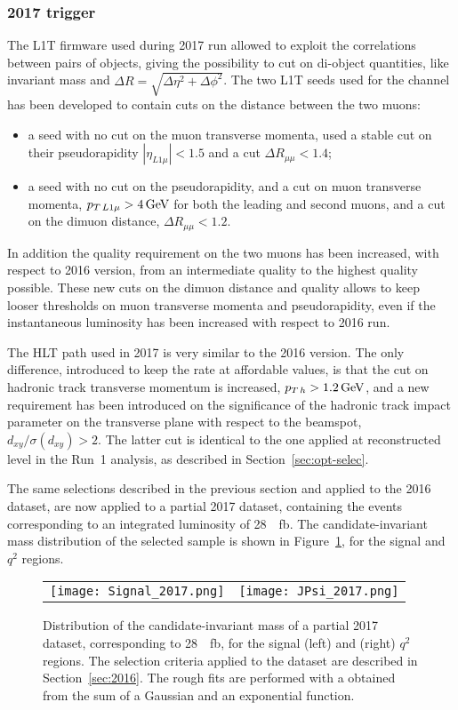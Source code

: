 \subsubsection{2017 trigger}
\label{sec:2017}

The L1T firmware used during 2017 run allowed to exploit the correlations between pairs of objects, giving the possibility to cut on di-object quantities, like invariant mass and $\Delta R=\sqrt{\Delta\eta^2 + \Delta\phi^2}$.
The two L1T seeds used for the \BtoKstmumu channel has been developed to contain cuts on the distance between the two muons:
\begin{itemize}
\item a seed with no cut on the muon transverse momenta, used a stable cut on their pseudorapidity $|\eta_{L1\mu}|<1.5$ and a cut $\Delta R_{\mu\mu}<1.4$;
\item a seed with no cut on the pseudorapidity, and a cut on muon transverse momenta, $p_{T\,L1\mu}>4\,\textrm{GeV}$ for both the leading and second muons, and a cut on the dimuon distance, $\Delta R_{\mu\mu}<1.2$.
\end{itemize}
In addition the quality requirement on the two muons has been increased, with respect to 2016 version, from an intermediate quality to the highest quality possible.
These new cuts on the dimuon distance and quality allows to keep looser thresholds on muon transverse momenta and pseudorapidity, even if the instantaneous luminosity has been increased with respect to 2016 run.

The HLT path used in 2017 is very similar to the 2016 version.
The only difference, introduced to keep the rate at affordable values, is that the cut on hadronic track transverse momentum is increased, $p_{T\,h}>1.2\,\textrm{GeV}$, and a new requirement has been introduced on the significance of the hadronic track impact parameter on the transverse plane with respect to the beamspot, $d_{xy}/\sigma(d_{xy}) > 2$.
The latter cut is identical to the one applied at reconstructed level in the Run~1 analysis, as described in Section~\ref{sec:opt-selec}.

The same selections described in the previous section and applied to the 2016 dataset, are now applied to a partial 2017 dataset, containing the events corresponding to an integrated luminosity of \SI{28}{\per\femto\barn}.
The candidate-\PBz invariant mass distribution of the selected sample is shown in Figure~\ref{fig:prosp-2017}, for the signal and \JPsi $q^2$ regions.

\begin{figure}[!hbt]
  \centering
  \begin{tabular}{cc}
    \texttt{[image: Signal\_2017.png]} &
    \texttt{[image: JPsi\_2017.png]}
  \end{tabular}
  \caption{Distribution of the candidate-\PBz invariant mass of a partial 2017 dataset, corresponding to \SI{28}{\per\femto\barn}, for the signal (left) and \JPsi (right) $q^2$ regions.
    The selection criteria applied to the dataset are described in Section~\ref{sec:2016}.
    The rough fits are performed with a \pdf obtained from the sum of a Gaussian and an exponential function.
  \label{fig:prosp-2017}}
\end{figure}

